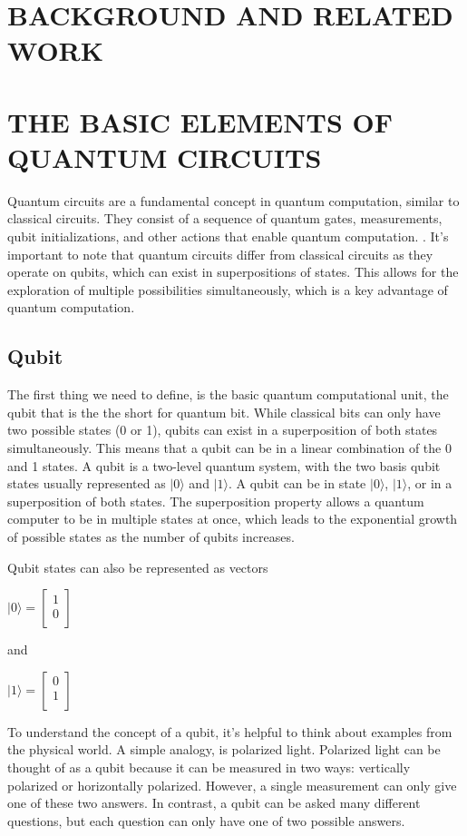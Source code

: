 \documentclass[inscr,ack,preface]{diphdthesis}
\begin{document}
\chapter{BACKGROUND AND RELATED WORK}

\chapter{THE BASIC ELEMENTS OF QUANTUM CIRCUITS}

Quantum circuits are a fundamental concept in quantum computation, similar to classical circuits. They consist of a sequence of quantum gates, measurements, qubit initializations, and other actions that enable quantum computation. \cite{niel}. It's important to note that quantum circuits differ from classical circuits as they operate on qubits, which can exist in superpositions of states. This allows for the exploration of multiple possibilities simultaneously, which is a key advantage of quantum computation. 

\section{Qubit}

The first thing we need to define, is the basic quantum computational unit, the qubit that is the the short for quantum bit. 
 While classical bits can only have two possible states (0 or 1), qubits can exist in a superposition of both states simultaneously. This means that a qubit can be in a linear combination of the 0 and 1 states. A qubit is a two-level quantum system, with the two basis qubit states usually represented as $\vert0\rangle$ and $\vert1\rangle$. A qubit can be in state $\vert0\rangle$, $\vert1\rangle$, or in a superposition of both states. The superposition property allows a quantum computer to be in multiple states at once, which leads to the exponential growth of possible states as the number of qubits increases.\cite{qubit}
 
 Qubit states can also be represented as vectors
 \begin{center}
 \Large
 $\vert0\rangle = 
    \begin{bmatrix}
    1 \\
    0 \\
    \end{bmatrix}$
\end{center}
\normalsize
and \\
\begin{center}
\Large
$\vert1\rangle = 
\begin{bmatrix}
0 \\
1 \\
\end{bmatrix}$
\end{center}
\normalsize
To understand the concept of a qubit, it's helpful to think about examples from the physical world. A simple analogy, is polarized light. Polarized light can be thought of as a qubit because it can be measured in two ways: vertically polarized or horizontally polarized. However, a single measurement can only give one of these two answers. In contrast, a qubit can be asked many different questions, but each question can only have one of two possible answers\cite{polarized}.
\end{document}
